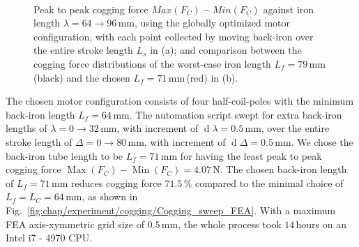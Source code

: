     
    \begin{figure}[h]
        \centering
        \\
        \caption{Peak to peak cogging force $Max(F_C) - Min(F_C )$ against iron length $\lambda = 64 \rightarrow 96 \,\mathrm{mm}$, using the globally optimized motor configuration, with each point collected by moving back-iron over the entire stroke length $L_s$ in (a); and comparison between the cogging force distributions of the worst-case iron length $L_f = 79\,\mathrm{mm}$\,(black) and the chosen $L_f = 71\,\mathrm{mm}$\,(red) in (b).}
    \end{figure}
    

    The chosen motor configuration consists of four half-coil-poles with the minimum back-iron length $L_f = 64\,\mathrm{mm}$. The automation script swept for extra back-iron lengths of $\lambda = 0 \rightarrow 32\,\mathrm{mm}$, with increment of $\operatorname d\lambda = 0.5\,\mathrm{mm}$, over the entire stroke length of $\Delta = 0 \rightarrow 80\,\mathrm{mm}$, with increment of $\operatorname d\Delta = 0.5\,\mathrm{mm}$. We chose the back-iron tube length to be $L_f = 71\,\mathrm{mm}$ for having the least peak to peak cogging force $\operatorname{Max}(F_C) - \operatorname{Min}(F_C ) = 4.07\,\mathrm{N}$. The chosen back-iron length of $L_f = 71\,\mathrm{mm}$ reduces cogging force $71.5\,\%$ compared to the minimal choice of $L_f = L_C = 64\,\mathrm{mm}$, as shown in  Fig.~\ref{fig:chap/experiment/cogging/Cogging_sweep_FEA}. With a maximum FEA axis-xymmetric grid size of $0.5\,\mathrm{mm}$, the whole process took $14$\,hours on an Intel i7 - 4970 CPU.
    



